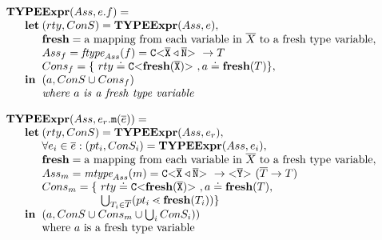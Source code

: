 \documentclass[acmsmall,screen,review]{acmart}
\begin{document}
$\begin{array}{@{}l@{}l@{}l}
\textbf{TY}& \textbf{PE} & \textbf{Expr} (Ass, e.f ) = \\
& \textbf{let} %
& (rty, ConS) = \textbf{TYPEExpr}(Ass, e),\\
& & \textbf{fresh} = \text{a mapping from each variable in}\ \ol{X} \ \text{to a fresh type variable},\\
& & Ass_{f} = \textit{ftype}_{Ass}(f) = \exptype{C}{\ol{X} \triangleleft \ol{N}} \to T \\
& & Cons_{f} = \{\ rty \doteq \exptype{C}{\textbf{fresh}(\ol{X})}, a \doteq \textbf{fresh}(T)\},\\
& \mathbf{in}%
& (a, ConS \cup Cons_{f})\\
& & \mathit{where\ } a \mathit{\ is\ a\ fresh\
  type\ variable}\\ 
\end{array}
$

\smallskip

$\begin{array}{@{}l@{}l@{}l}
\textbf{TY}& \textbf{PE} & \textbf{Expr} (Ass, e_r.\mathtt{m}(\overline{e}) ) = \\
& \textbf{let} %
& (rty, ConS) = \textbf{TYPEExpr}(Ass, e_r),\\
& & \forall e_i \in \overline{e} : (pt_i, ConS_i) = \textbf{TYPEExpr}(Ass, e_i)  ,\\
& & \textbf{fresh} = \text{a mapping from each variable in}\ \ol{X} \ \text{to a fresh type variable},\\
& & Ass_{m} = \textit{mtype}_{Ass}(m) = \exptype{C}{\ol{X} \triangleleft \ol{N}} \to \exptype{}{\ol{Y}} (\ol{T} \to T) \\
& & \begin{array}{@{}l@{}l}
        Cons_{m} = \{\ & rty \doteq \exptype{C}{\textbf{fresh}(\ol{X})}, a \doteq \textbf{fresh}(T),\\
                    & \bigcup_{T_i \in \overline{T}} (pt_i \lessdot \textbf{fresh}(T_i)) \} %
    \end{array}\\
& \mathbf{in}%
& (a, ConS \cup Cons_{m} \cup \bigcup_i ConS_i))\\
& & \text{where\ } a \text{\ is\ a\ fresh\
  type\ variable}\\ 
\end{array}
$
\end{document}
